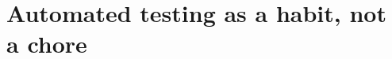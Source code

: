 \chapter{Automated testing as a habit, not a chore}
\label{ch:automated-testing-as-a-habit-not-a-chore}

